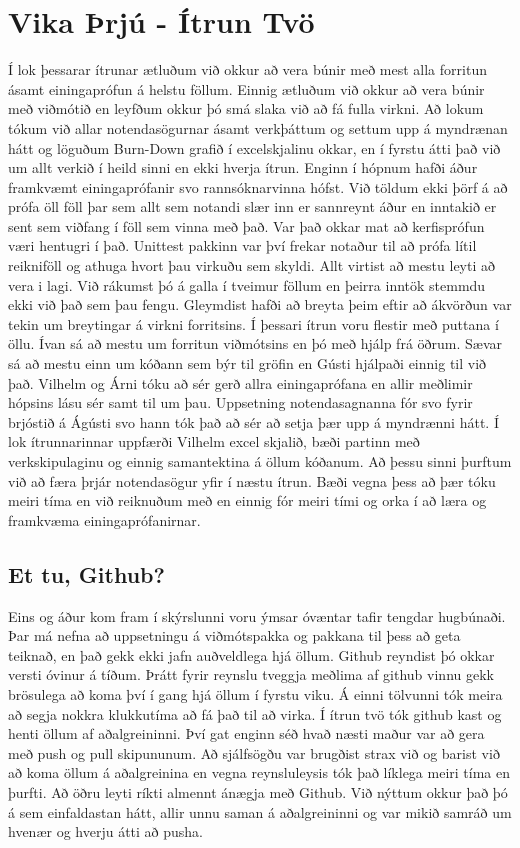 \documentclass[a4paper,10pt]{article}
\begin{document}
\section{Vika Þrjú - Ítrun Tvö}
Í lok þessarar ítrunar ætluðum við okkur að vera búnir með mest alla forritun ásamt einingaprófun á helstu föllum.  Einnig ætluðum við okkur að vera búnir með viðmótið en leyfðum okkur þó smá slaka við að fá fulla virkni.  Að lokum tókum við allar notendasögurnar ásamt verkþáttum og settum upp á myndrænan hátt og löguðum Burn-Down grafið í excelskjalinu okkar, en í fyrstu átti það við um allt verkið í heild sinni en ekki hverja ítrun.   
Enginn í hópnum hafði áður framkvæmt einingaprófanir svo rannsóknarvinna hófst.  Við töldum ekki þörf á að prófa öll föll þar sem allt sem notandi slær inn er sannreynt áður en inntakið er sent sem viðfang í föll sem vinna með það.  Var það okkar mat að kerfisprófun væri hentugri í það.  Unittest pakkinn var því frekar notaður til að prófa lítil reikniföll og athuga hvort þau virkuðu sem skyldi.  Allt virtist að mestu leyti að vera i lagi.  Við rákumst þó á galla í tveimur föllum en þeirra inntök stemmdu ekki við það sem þau fengu.  Gleymdist hafði að breyta þeim eftir að ákvörðun var tekin um breytingar á virkni forritsins.  Í þessari ítrun voru flestir með puttana í öllu.  Ívan sá að mestu um forritun viðmótsins en þó með hjálp frá öðrum.  Sævar sá að mestu einn um kóðann sem býr til gröfin en Gústi hjálpaði einnig til við það.  Vilhelm og Árni tóku að sér gerð allra einingaprófana en allir meðlimir hópsins lásu sér samt til um þau.  Uppsetning notendasagnanna fór svo fyrir brjóstið á Ágústi svo hann tók það að sér að setja þær upp á myndrænni hátt.  Í lok ítrunnarinnar uppfærði Vilhelm excel skjalið, bæði partinn með verkskipulaginu og einnig samantektina á öllum kóðanum.  
Að þessu sinni þurftum við að færa þrjár notendasögur yfir í næstu ítrun.  Bæði vegna þess að þær tóku meiri tíma en við reiknuðum með en einnig fór meiri tími og orka í að læra og framkvæma einingaprófanirnar.

\subsection{Et tu, Github?}
Eins og áður kom fram í skýrslunni voru ýmsar óvæntar tafir tengdar hugbúnaði.  Þar má nefna að uppsetningu á viðmótspakka og pakkana til þess að geta teiknað, en það gekk ekki jafn auðveldlega hjá öllum.  Github reyndist þó okkar versti óvinur á tíðum.  Þrátt fyrir reynslu tveggja meðlima af github vinnu gekk brösulega að koma því í gang hjá öllum í fyrstu viku.  Á einni tölvunni tók meira að segja nokkra klukkutíma að fá það til að virka.  Í ítrun tvö tók github kast og henti öllum af aðalgreininni.  Því gat enginn séð hvað næsti maður var að gera með push og pull skipununum.  Að sjálfsögðu var brugðist strax við og barist við að koma öllum á aðalgreinina en vegna reynsluleysis tók það líklega meiri tíma en þurfti.  Að öðru leyti ríkti almennt ánægja með Github.  Við nýttum okkur það þó á sem einfaldastan hátt, allir unnu saman á aðalgreininni og var mikið samráð um hvenær og hverju átti að pusha.
\end{document}
